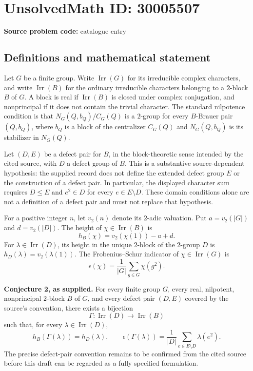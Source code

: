 \documentclass[11pt]{article}
\begin{document}
\section*{UnsolvedMath ID: 30005507}
\textbf{Source problem code:} catalogue entry
\subsection{Definitions and mathematical statement}
Let \(G\) be a finite group. Write \(\operatorname{Irr}(G)\) for its irreducible complex characters, and write \(\operatorname{Irr}(B)\) for the ordinary irreducible characters belonging to a \(2\)-block \(B\) of \(G\). A block is real if \(\operatorname{Irr}(B)\) is closed under complex conjugation, and nonprincipal if it does not contain the trivial character. The standard nilpotence condition is that \(N_G(Q,b_Q)/C_G(Q)\) is a \(2\)-group for every \(B\)-Brauer pair \((Q,b_Q)\), where \(b_Q\) is a block of the centralizer \(C_G(Q)\) and \(N_G(Q,b_Q)\) is its stabilizer in \(N_G(Q)\).

Let \((D,E)\) be a defect pair for \(B\), in the block-theoretic sense intended by the cited source, with \(D\) a defect group of \(B\). This is a substantive source-dependent hypothesis: the supplied record does not define the extended defect group \(E\) or the construction of a defect pair. In particular, the displayed character sum requires \(D\leq E\) and \(e^2\in D\) for every \(e\in E\setminus D\). These domain conditions alone are not a definition of a defect pair and must not replace that hypothesis.

For a positive integer \(n\), let \(v_2(n)\) denote its \(2\)-adic valuation. Put \(a=v_2(|G|)\) and \(d=v_2(|D|)\). The height of \(\chi\in\operatorname{Irr}(B)\) is
\[
 h_B(\chi)=v_2(\chi(1))-a+d.
\]
For \(\lambda\in\operatorname{Irr}(D)\), its height in the unique \(2\)-block of the \(2\)-group \(D\) is \(h_D(\lambda)=v_2(\lambda(1))\). The Frobenius--Schur indicator of \(\chi\in\operatorname{Irr}(G)\) is
\[
 \epsilon(\chi)=\frac{1}{|G|}\sum_{g\in G}\chi(g^2).
\]

\textbf{Conjecture 2, as supplied.} For every finite group \(G\), every real, nilpotent, nonprincipal \(2\)-block \(B\) of \(G\), and every defect pair \((D,E)\) covered by the source's convention, there exists a bijection
\[
 \Gamma:\operatorname{Irr}(D)\longrightarrow\operatorname{Irr}(B)
\]
such that, for every \(\lambda\in\operatorname{Irr}(D)\),
\[
 h_B(\Gamma(\lambda))=h_D(\lambda),
 \qquad
 \epsilon(\Gamma(\lambda))
 =\frac{1}{|D|}\sum_{e\in E\setminus D}\lambda(e^2).
\]
The precise defect-pair convention remains to be confirmed from the cited source before this draft can be regarded as a fully specified formulation.
\end{document}
